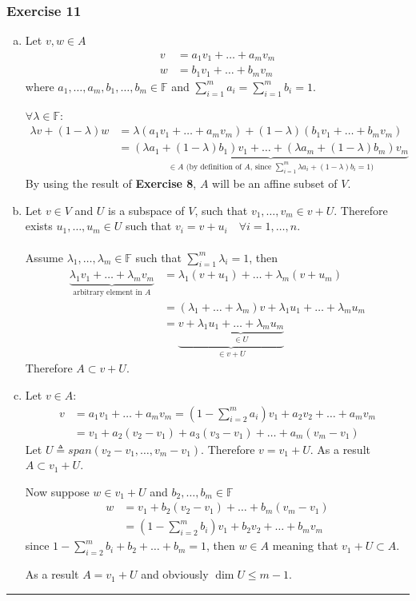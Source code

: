 \documentclass[12pt, letterpaper]{scrartcl}
\newcommand{\F}{\mathbb{F}}
\begin{document}
\subsubsection*{Exercise 11}
\begin{enumerate}[(a)]
    \item 
    Let $v,w\in A$
    \begin{align*}
        v&=a_1v_1+\dots+a_mv_m\\
        w&=b_1v_1+\dots+b_mv_m
    \end{align*}
    where $a_1,\dots,a_m,b_1,\dots,b_m\in\F$ and $\sum_{i=1}^m a_i =\sum_{i=1}^m b_i=1$.
    
    $\forall \lambda \in \F$:
    \begin{align*}
        \lambda v+(1-\lambda)w&=\lambda(a_1v_1+\dots+a_mv_m)+(1-\lambda)(b_1v_1+\dots+b_mv_m)\\
        &=\underbrace{(\lambda a_1+(1-\lambda)b_1) v_1 + \dots + (\lambda a_m+(1-\lambda)b_m)v_m}_{\in A \text{ (by definition of $A$, since } \sum_{i=1}^m\lambda a_i+(1-\lambda)b_i=1)}
    \end{align*}
    By using the result of \textbf{Exercise 8}, $A$ will be an affine subset of $V$.
    \item Let $v\in V$ and $U$ is a subspace of $V$, such that $v_1,\dots,v_m\in v+U$. Therefore exists $u_1, \dots, u_m\in U$ such that $v_i=v+u_i \quad\forall i=1,\dots,n$.\\\\
    Assume $\lambda_1,\dots, \lambda_m\in\F$ such that $\sum_{i=1}^m\lambda_i=1$, then
    \begin{align*}
    \underbrace{\lambda_1v_1+\dots+\lambda_mv_m}_{\text{arbitrary element in }A}&=\lambda_1(v+u_1)+\dots+\lambda_m(v+u_m)\\
    &=(\lambda_1+\dots+\lambda_m)v + \lambda_1u_1+\dots+\lambda_mu_m\\
    &=\underbrace{v+\underbrace{\lambda_1u_1+\dots+\lambda_mu_m}_{\in U}}_{\in v+U}
    \end{align*}
    Therefore $A\subset v+U$.
    
    \item 
    Let $v\in A$:
    \begin{align*}
        v&=a_1v_1+\dots+a_mv_m=(1-\sum_{i=2}^m a_i)v_1+a_2v_2+\dots+a_mv_m\\
        &=v_1+a_2(v_2-v_1)+a_3(v_3-v_1)+\dots+a_m(v_m-v_1)
    \end{align*}
    Let $U\triangleq span(v_2-v_1, \dots, v_m-v_1)$. Therefore $v=v_1+U$. As a result $A\subset v_1+U$.

    Now suppose $w\in v_1+U$ and $b_2, \dots, b_m\in \F$
    \begin{align*}
        w&=v_1+b_2(v_2-v_1)+\dots+b_m(v_m-v_1)\\
        &=(1-\sum_{i=2}^m b_i)v_1+b_2v_2+\dots+b_mv_m
    \end{align*}
    since $1-\sum_{i=2}^m b_i+ b_2+\dots+b_m=1$, then $w\in A$ meaning that $v_1+U\subset A$.

    As a result $A=v_1+U$ and obviously $\dim U\leq m-1$.
\end{enumerate}
\vskip1mm\hrule
\end{document}
